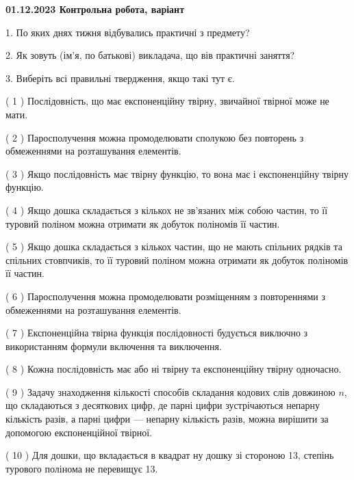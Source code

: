 \documentclass[12pt, ukrainian]{article}
\begin{document}
\begin {large}

\textbf{01.12.2023 Контрольна робота, варіант  }\par


{
1. По яких днях тижня відбувались практичні з предмету?



\vspace{5mm}
2. Як зовуть (ім'я, по батькові) викладача, що вів практичні заняття?



\vspace{5mm}
3. Виберіть всі правильні твердження, якщо такі тут є.\par
\vspace{2mm}
( 1 ) Послідовність, що має експоненційну твірну, звичайної твірної може не мати.%

( 2 ) Паросполучення можна промоделювати сполукою без повторень з обмеженнями на розташування елементів.%

( 3 ) Якщо послідовність має твірну функцію, то вона має і експоненційну твірну функцію.%

( 4 ) Якщо дошка складається з кількох не зв’язаних між собою частин, то її туровий поліном можна отримати як добуток поліномів її частин.%

( 5 ) Якщо дошка складається з кількох частин, що не мають спільних рядків та спільних стовпчиків, то її туровий поліном можна отримати як добуток поліномів її частин.%

( 6 ) Паросполучення можна промоделювати розміщенням з повтореннями з обмеженнями на розташування елементів.%

( 7 ) Експоненційна твірна функція послідовності будується виключно з використанням формули включення та виключення.%

( 8 ) Кожна послідовність має або ні твірну та експоненційну твірну одночасно.%

( 9 ) Задачу знаходження кількості способів складання кодових слів довжиною $n$, що складаються з десяткових цифр, де парні цифри зустрічаються непарну кількість разів, а парні цифри — непарну кількість разів, можна вирішити за допомогою експоненційної твірної.%

( 10 ) Для дошки, що вкладається в квадрат ну дошку зі стороною 13, степінь турового полінома не перевищує 13.%
}
\end {large}
\end{document}
